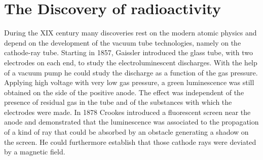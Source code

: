 \section{The Discovery of radioactivity}
During the XIX century many discoveries rest on the modern atomic physics and depend on the development of the vacuum tube technologies, namely on the cathode-ray tube. Starting in 1857, Gaissler introduced the glass tube, with two electrodes on each end, to study the electroluminescent discharges. With the help of a vacuum pump he could study the discharge as a function of the gas pressure. Applying high voltage with very low gas pressure, a green luminescence was still obtained on the side of the positive anode. The effect was independent of the presence of residual gas in the tube and of the substances with which the electrodes were made. In 1878 Crookes introduced a fluorescent screen near the anode and demonstrated that the luminescence was associated to the propagation of a kind of ray that could be absorbed by an obstacle generating a shadow on the screen. He could furthermore establish that those cathode rays were deviated by a magnetic field.

